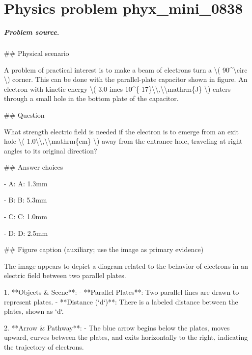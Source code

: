 
\chapter{Physics problem phyx\_mini\_0838}
\label{ch:PhyXMiniProblems_problem_phyx_mini_0838}

\paragraph{Problem source.}
\#\# Physical scenario

A problem of practical interest is to make a beam of electrons turn a \textbackslash{}( 90\textasciicircum{}\textbackslash{}circ \textbackslash{}) corner. This can be done with the parallel-plate capacitor shown in figure. An electron with kinetic energy \textbackslash{}( 3.0 	imes 10\textasciicircum{}\{-17\}\textbackslash{}\textbackslash{},\textbackslash{}\textbackslash{}mathrm\{J\} \textbackslash{}) enters through a small hole in the bottom plate of the capacitor.

\#\# Question

What strength electric field is needed if the electron is to emerge from an exit hole \textbackslash{}( 1.0\textbackslash{}\textbackslash{},\textbackslash{}\textbackslash{}mathrm\{cm\} \textbackslash{}) away from the entrance hole, traveling at right angles to its original direction?

\#\# Answer choices

- A: A: 1.3mm

- B: B: 5.3mm

- C: C: 1.0mm

- D: D: 2.5mm

\#\# Figure caption (auxiliary; use the image as primary evidence)

The image appears to depict a diagram related to the behavior of electrons in an electric field between two parallel plates.

1. **Objects \& Scene**:
   - **Parallel Plates**: Two parallel lines are drawn to represent plates.
   - **Distance (`d`)**: There is a labeled distance between the plates, shown as `d`.

2. **Arrow \& Pathway**:
   - The blue arrow begins below the plates, moves upward, curves between the plates, and exits horizontally to the right, indicating the trajectory of electrons.
   
